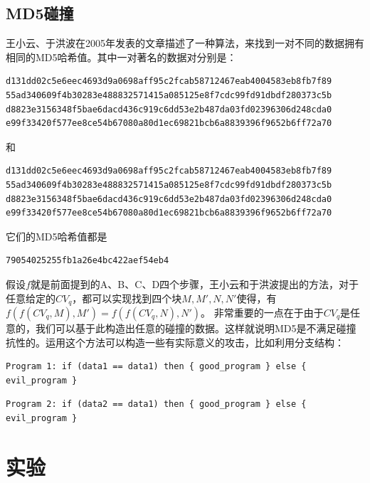 \documentclass[UTF8, a4paper, 11pt]{article}
\begin{document}
\subsection{MD5碰撞}
王小云、于洪波在2005年发表的文章描述了一种算法，来找到一对不同的数据拥有相同的MD5哈希值。其中一对著名的数据对分别是：
\begin{lstlisting}
d131dd02c5e6eec4693d9a0698aff95c2fcab58712467eab4004583eb8fb7f89 
55ad340609f4b30283e488832571415a085125e8f7cdc99fd91dbdf280373c5b 
d8823e3156348f5bae6dacd436c919c6dd53e2b487da03fd02396306d248cda0 
e99f33420f577ee8ce54b67080a80d1ec69821bcb6a8839396f9652b6ff72a70
\end{lstlisting}
和
\begin{lstlisting}
d131dd02c5e6eec4693d9a0698aff95c2fcab58712467eab4004583eb8fb7f89 
55ad340609f4b30283e488832571415a085125e8f7cdc99fd91dbdf280373c5b 
d8823e3156348f5bae6dacd436c919c6dd53e2b487da03fd02396306d248cda0 
e99f33420f577ee8ce54b67080a80d1ec69821bcb6a8839396f9652b6ff72a70
\end{lstlisting}
它们的MD5哈希值都是
\begin{lstlisting}
79054025255fb1a26e4bc422aef54eb4
\end{lstlisting}
假设$f$就是前面提到的A、B、C、D四个步骤，王小云和于洪波提出的方法，对于任意给定的$CV_q$，都可以实现找到四个块$M,M',N,N'$使得，有$f(f(CV_q,M),M')=f(f(CV_q,N),N')$。
非常重要的一点在于由于$CV_q$是任意的，我们可以基于此构造出任意的碰撞的数据。这样就说明MD5是不满足碰撞抗性的。运用这个方法可以构造一些有实际意义的攻击，比如利用分支结构：
\begin{lstlisting}
Program 1: if (data1 == data1) then { good_program } else { evil_program }
\end{lstlisting}
\begin{lstlisting}
Program 2: if (data2 == data1) then { good_program } else { evil_program }
\end{lstlisting}

\section{实验}
\end{document}
